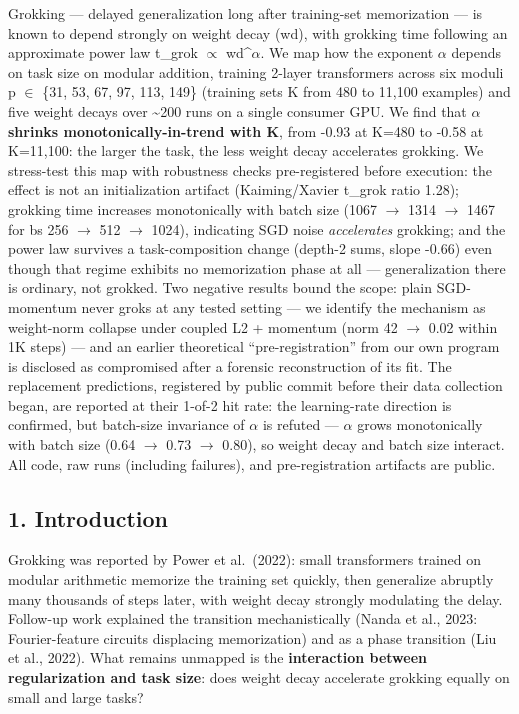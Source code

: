 \documentclass[
  11pt,
]{article}
\begin{document}
Grokking --- delayed generalization long after training-set memorization
--- is known to depend strongly on weight decay (wd), with grokking time
following an approximate power law t\_grok $\propto$ wd\^{}$\alpha$. We map how the
exponent $\alpha$ depends on task size on modular addition, training 2-layer
transformers across six moduli p $\in$ \{31, 53, 67, 97, 113, 149\}
(training sets K from 480 to 11,100 examples) and five weight decays
over \textasciitilde200 runs on a single consumer GPU. We find that
\textbf{\textbar $\alpha$\textbar{} shrinks monotonically-in-trend with K},
from -0.93 at K=480 to -0.58 at K=11,100: the larger the task, the less
weight decay accelerates grokking. We stress-test this map with
robustness checks pre-registered before execution: the effect is not an
initialization artifact (Kaiming/Xavier t\_grok ratio 1.28); grokking
time increases monotonically with batch size (1067 $\to$ 1314 $\to$ 1467 for bs
256 $\to$ 512 $\to$ 1024), indicating SGD noise \emph{accelerates} grokking; and
the power law survives a task-composition change (depth-2 sums, slope
-0.66) even though that regime exhibits no memorization phase at all ---
generalization there is ordinary, not grokked. Two negative results
bound the scope: plain SGD-momentum never groks at any tested setting
--- we identify the mechanism as weight-norm collapse under coupled L2 +
momentum (norm 42 $\to$ 0.02 within 1K steps) --- and an earlier theoretical
``pre-registration'' from our own program is disclosed as compromised
after a forensic reconstruction of its fit. The replacement predictions,
registered by public commit before their data collection began, are
reported at their 1-of-2 hit rate: the learning-rate direction is
confirmed, but batch-size invariance of $\alpha$ is refuted ---
\textbar $\alpha$\textbar{} grows monotonically with batch size (0.64 $\to$ 0.73 $\to$
0.80), so weight decay and batch size interact. All code, raw runs
(including failures), and pre-registration artifacts are public.

\subsection{1. Introduction}\label{introduction}

Grokking was reported by Power et al.~(2022): small transformers trained
on modular arithmetic memorize the training set quickly, then generalize
abruptly many thousands of steps later, with weight decay strongly
modulating the delay. Follow-up work explained the transition
mechanistically (Nanda et al., 2023: Fourier-feature circuits displacing
memorization) and as a phase transition (Liu et al., 2022). What remains
unmapped is the \textbf{interaction between regularization and task
size}: does weight decay accelerate grokking equally on small and large
tasks?
\end{document}
